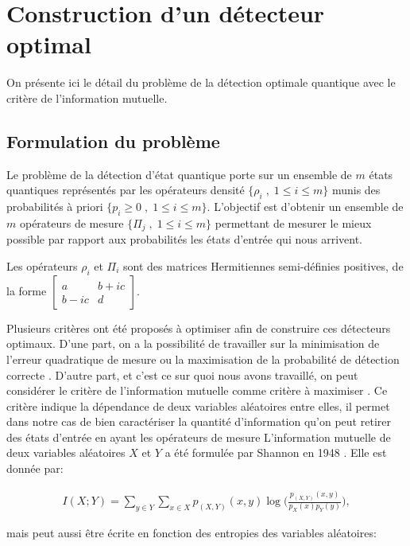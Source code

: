 \chapter{Construction d'un détecteur optimal}

On présente ici le détail du problème de la détection optimale quantique avec le critère de l'information mutuelle. 

\section{Formulation du problème}
Le problème de la détection d'état quantique porte sur un ensemble de $m$ états quantiques représentés par les opérateurs densité $\{\rho_i \; , \; 1 \leq i \leq m\}$ munis des probabilités à priori $\{p_i \geq 0 \; , \; 1 \leq i \leq m \}$. L'objectif est d'obtenir un ensemble de $m$ opérateurs de mesure $\{\Pi_j \; , \; 1 \leq i \leq m\}$ permettant de mesurer le mieux possible par rapport aux probabilités les états d'entrée qui nous arrivent.

Les opérateurs $\rho_i$ et $\Pi_i$ sont des matrices Hermitiennes semi-définies positives, de la forme $\begin{bmatrix}a & b+ic \\ b-ic & d \end{bmatrix}$.

Plusieurs critères ont été proposés à optimiser afin de construire ces détecteurs optimaux. D'une part, on a la possibilité de travailler sur la minimisation de l'erreur quadratique de mesure \cite{Eldar01} ou la maximisation de la probabilité de détection correcte \cite{Eldar03c}. D'autre part, et c'est ce sur quoi nous avons travaillé, on peut considérer le critère de l'information mutuelle comme critère à maximiser \cite{Davies78}. Ce critère indique la dépendance de deux variables aléatoires entre elles, il permet dans notre cas de bien caractériser la quantité d'information qu'on peut retirer des états d'entrée en ayant les opérateurs de mesure
\medbreak
L'information mutuelle de deux variables aléatoires $X$ et $Y$ a été formulée par Shannon en 1948 \cite{Shannon48}. Elle est donnée par:

\begin{align}
    I(X;Y) = \displaystyle \sum_{y \in Y} \displaystyle \sum_{x \in X} p_{(X, Y)}(x, y) \log \big(\frac{p_{(X, Y)}(x, y)}{p_X(x) p_Y(y)}\big),
\end{align}

mais peut aussi être écrite en fonction des entropies des variables aléatoires:

